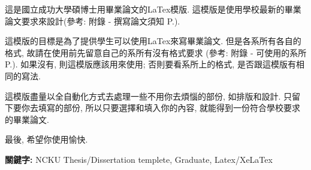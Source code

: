 \StartAbstract

這是國立成功大學碩博士用畢業論文的LaTex模版. 這模版是使用學校最新的畢業論文要求來設計(參考: 附錄 - 撰寫論文須知 P.\pageref{appendix:thesis-spec}).

這模版的目標是為了提供學生可以使用LaTex來寫畢業論文. 但是各系所有各自的格式, 故請在使用前先留意自己的系所有沒有格式要求 (參考: 附錄 - 可使用的系所 P.\pageref{appendix:acceptable-dept}). 如果沒有, 則這模版應該用來使用; 否則要看系所上的格式, 是否跟這模版有相同的寫法.

這模版盡量以全自動化方式去處理一些不用你去煩惱的部份, 如排版和設計. 只留下要你去填寫的部份, 所以只要選擇和填入你的內容, 就能得到一份符合學校要求的畢業論文.

最後, 希望你使用愉快.


{\bf 關鍵字:} NCKU Thesis/Dissertation templete, Graduate, Latex/XeLaTex

\EndAbstract
